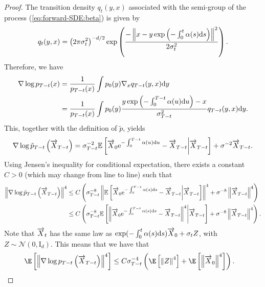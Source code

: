 \documentclass[english,graybox,envcountchap,envcountsame,sectrefs,shortlabels]{svmono}
\theoremstyle{style}
\newcommand{\rme}{\mathrm{e}}
\newcommand{\eqsp}{}
\begin{document}
\begin{proof}
The transition density $q_t(y,x) $ associated with the semi-group of the process (\ref{eq:forward-SDE:beta}) is given by 
\begin{align*}
q_t(y,x) =  \left(2 \pi \sigma_t^2 \right)^{-d/2} \exp\left( { \frac{-\left\| x - y \exp\left({- \int_0^t \alpha (s) \rmd s}\right) \right\|^2}{2 \sigma_t^2}} \right)\eqsp. 
\end{align*}
Therefore, we have 
\begin{align*}
    \nabla \log p_{T-t} (x) &= \frac{1}{p_{T-t}(x)} \int p_0(y)\nabla_x q_{T-t}(y,x) \rmd y \\
    &= \frac{1}{p_{T-t}(x)} \int p_0(y) \frac{y \exp\left({- \int_0^{T-t} \alpha (u) \rmd u}\right) - x }{\sigma^2_{T-t}}
    q_{T-t}(y,x) \rmd y\eqsp. 
\end{align*}
This, together with the definition of $\tilde p$, yields 
\begin{align*}
\nabla \log \tilde p_{T-t} \left( \ora X_{T-t} \right) = \sigma_{T-t}^{-2} \mathbb{E} \left[ \ora X_0 \rme^{- \int_0^{T-t} \alpha (u) \rmd u} - \ora X_{T-t} \middle| \ora X_{T-t}\right] + \sigma^{-2}\ora X_{T-t}\eqsp.
\end{align*}
Using Jensen's inequality for conditional expectation, there exists a constant $C>0$ (which may change from line to line) such that 
\begin{align*}
     \left\| \nabla \log \tilde p_{T-t} \left( \ora X_{T-t} \right) \right\|^4 
     & \leq
     C\left(\sigma_{T-t}^{-8} \left\| \mathbb{E} \left[  \ora X_{0} \rme^{- \int_0^{T-t} \alpha (s) \rmd s} - \ora X_{T-t} \middle| \ora X_{T-t}  \right] \right\|^4+
     \sigma^{-8} \left\|\ora X_{T-t}\right\|^4
     \right)\\
    & \leq C\left(\sigma_{T-t}^{-8}  \mathbb{E} \left[ \left\|  \ora X_{0} \rme^{- \int_0^{T-t} \alpha (s) \rmd s} - \ora X_{T-t} \right\|^4 \middle| \ora X_{T-t}  \right]+
     \sigma^{-8}\left\|\ora X_{T-t}\right\|^4
     \right)\eqsp.
\end{align*}
Note that $\overrightarrow X_t$ has the same law as $\exp(-\int_0^t \alpha(s) \mathrm{d} s) \overrightarrow X_0  + \sigma_t Z$, with $Z \sim \mathcal{N}(0, \mathrm{I}_d)$. This means that we have that
\begin{align*}
     \E\left[\left\| \nabla \log p_{T-t} \left( \ora X_{T-t} \right) \right\|^4\right] & \leq C\sigma_{T-t}^{-4} \left(    \E\left[\left\| Z \right\|^4\right] + \E\left[\left\| \ora X_0 \right\|^4 \right]
     \right)\eqsp. 
\end{align*}

\end{proof}
\end{document}
